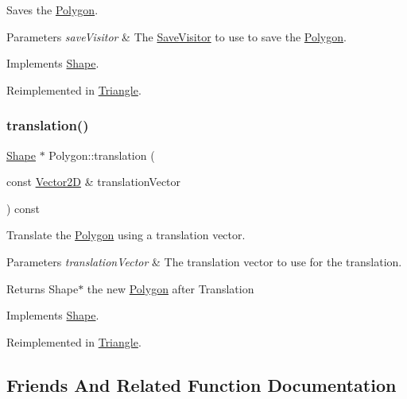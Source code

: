 Saves the \hyperlink{class_polygon}{Polygon}. 
\begin{DoxyParams}{Parameters}
{\em save\+Visitor} & The \hyperlink{class_save_visitor}{Save\+Visitor} to use to save the \hyperlink{class_polygon}{Polygon}. \\
\hline
\end{DoxyParams}


Implements \hyperlink{class_shape_ae1477829e1b06aad805b8b76312f87bc}{Shape}.



Reimplemented in \hyperlink{class_triangle_ae9ac3d633172f14d391d290a4467e1d3}{Triangle}.

\hypertarget{class_polygon_ae828addfa5cffab547bcb16db1f275be}{}\label{class_polygon_ae828addfa5cffab547bcb16db1f275be} 
\subsubsection{\texorpdfstring{translation()}{translation()}}
{\footnotesize\ttfamily \hyperlink{class_shape}{Shape} $\ast$ Polygon\+::translation (\begin{DoxyParamCaption}\item[{const \hyperlink{class_vector2_d}{Vector2D} \&}]{translation\+Vector }\end{DoxyParamCaption}) const\hspace{0.3cm}{\ttfamily [virtual]}}

Translate the \hyperlink{class_polygon}{Polygon} using a translation vector. 
\begin{DoxyParams}{Parameters}
{\em translation\+Vector} & The translation vector to use for the translation. \\
\hline
\end{DoxyParams}
\begin{DoxyReturn}{Returns}
Shape$\ast$ the new \hyperlink{class_polygon}{Polygon} after Translation 
\end{DoxyReturn}


Implements \hyperlink{class_shape_ad3daca0d9bedf9aa15b92afab63c1de8}{Shape}.



Reimplemented in \hyperlink{class_triangle_ac66208b0b633add41b915860f051cf44}{Triangle}.



\subsection{Friends And Related Function Documentation}
\hypertarget{class_polygon_af7ce19139e0c1e3637615abf41b8befb}{}\label{class_polygon_af7ce19139e0c1e3637615abf41b8befb} 
